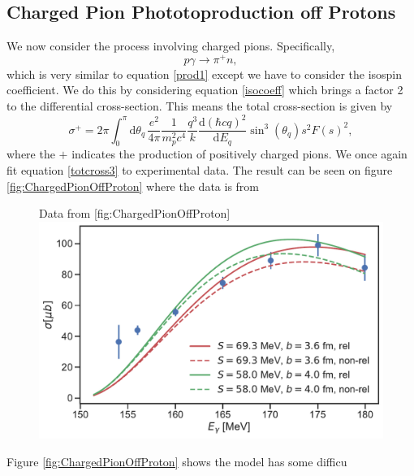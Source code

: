 \subsection{Charged Pion Phototoproduction off Protons}
We now consider the process involving charged pions. Specifically,
\begin{equation} \label{charged1}
	p\gamma \rightarrow \pi^+ n,
\end{equation}
which is very similar to equation \eqref{prod1} except we have to consider the isospin coefficient. We do this by considering equation \eqref{isocoeff} which brings a factor 2 to the differential cross-section. This means the total cross-section is given by
\begin{equation} \label{totcross3}
	\sigma^+ =  2\pi \int_0^\pi \text{d}\theta_q \, \frac{e^2}{4\pi}\frac{1}{m_p^2c^4}\frac{q^3}{k}\frac{\text{d}(\hbar c q)^2}{\text{d}E_q}\sin^3(\theta_q) s^2 F(s)^2,
\end{equation}
where the $+$ indicates the production of positively charged pions. We once again fit equation \eqref{totcross3} to experimental data. The result can be seen on figure \ref{fig:ChargedPionOffProton} where the data is from 
\begin{figure}[H]
	\begin{sidecaption}{Data from \cite{PionOffNeutron2}}[fig:ChargedPionOffProton]
		\includegraphics[width=\linewidth]{Figures/ChargedPionOffProtonExact.pdf}
	\end{sidecaption}
\end{figure}
Figure \ref{fig:ChargedPionOffProton} shows the model has some difficu
